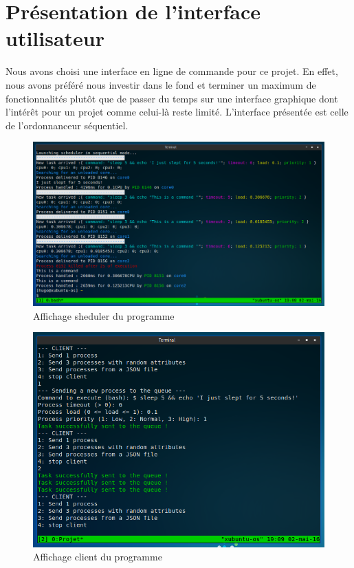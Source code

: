 \chapter{Présentation de l'interface utilisateur}

    Nous avons choisi une interface en ligne de commande pour ce projet. En effet, nous avons préféré nous investir dans le fond et terminer un maximum de fonctionnalités plutôt que de passer du temps sur une interface graphique dont l'intérêt pour un projet comme celui-là reste limité. L'interface présentée est celle de l'ordonnanceur séquentiel.

    \vfill
    \begin{figure}[!h]
        \centerline {\includegraphics[scale=0.5]{images/scheduler-s.png}}
        \caption{Affichage sheduler du programme}
        \label{Affichage scheduler du programme}
    \end{figure}
    
    \begin{figure}[!t]
        \centering
        \includegraphics[scale=0.5]{images/scheduler-c.png}
        \caption{Affichage client du programme}
        \label{Affichage client du programme}
    \end{figure}

